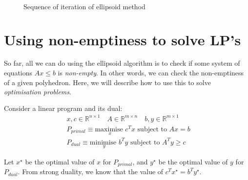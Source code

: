 \documentclass[conference]{IEEEtran}
\begin{document}
\begin{figure}
    \\
\caption{Sequence of iteration of ellipsoid method}
\end{figure}




\section{Using non-emptiness to solve LP's}
So far, all we can do using the ellipsoid algorithm is to check if some
system of equations $Ax \leq b$ is \textit{non-empty}. In other words, we
can check the non-emptiness of a given polyhedron. Here, we will describe how
to use this to solve \textit{optimisation problems}.

Consider a linear program and its dual:
\begin{align*}
        &x, c \in \mathbb R^{n \times 1} \quad A \in \mathbb R^{m \times n} \quad b, y \in \mathbb R^{m \times 1}\\
        &P_{primal} \equiv \underset{x}{\text{maximise }} c^T x \text{ subject to } Ax = b \\
        &P_{dual} \equiv \underset{y}{\text{minimise }} b^T y \text{ subject to } A^Ty \geq c \quad
\end{align*}

Let $x^\star$ be the optimal value of $x$ for $P_{primal}$, and $y^\star$ be the
optimal value of $y$ for $P_{dual}$. From strong duality, we know that
the value of $c^Tx^\star = b^Ty^\star$.
\end{document}
